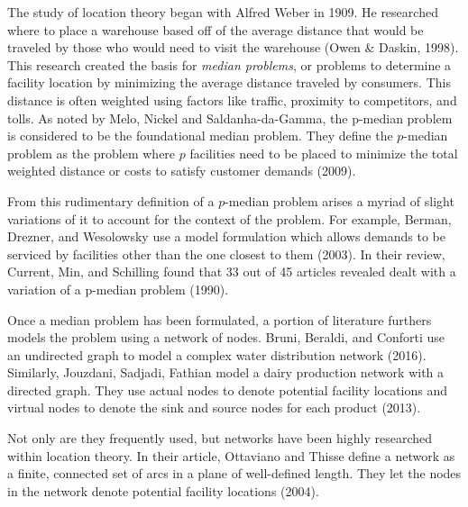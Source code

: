 \documentclass[twoside,twocolumn]{article}
\begin{document}
The study of location theory began with Alfred Weber in 1909.
He researched where to place a warehouse based off of the average distance that would be traveled by those who would need to visit the warehouse (Owen \& Daskin, 1998).
This research created the basis for {\em median problems}, or problems to determine a facility location by minimizing the average distance traveled by consumers. 
This distance is often weighted using factors like traffic, proximity to competitors, and tolls.
As noted by Melo, Nickel and Saldanha-da-Gamma, the p-median problem is considered to be the foundational median problem.
They define the $p$-median problem as the problem where $p$ facilities need to be placed to minimize the total weighted distance or costs to satisfy customer demands (2009).

From this rudimentary definition of a $p$-median problem arises a myriad of slight variations of it to account for the context of the problem. 
For example, Berman, Drezner, and Wesolowsky use a model formulation which allows demands to be serviced by facilities other than the one closest to them (2003). %
In their review, Current, Min, and Schilling found that 33 out of 45 articles revealed dealt with a variation of a p-median problem (1990).

Once a median problem has been formulated, a portion of literature furthers models the problem using a network of nodes.
Bruni, Beraldi, and Conforti use an undirected graph to model a complex water distribution network (2016).
Similarly, Jouzdani, Sadjadi, Fathian model a dairy production network with a directed graph.
They use actual nodes to denote potential facility locations and virtual nodes to denote the sink and source nodes for each product (2013).

Not only are they frequently used, but networks have been highly researched within location theory.
In their article, Ottaviano and Thisse define a network as a finite, connected set of arcs in a plane of well-defined length.
They let the nodes in the network denote potential facility locations (2004). %
\end{document}
